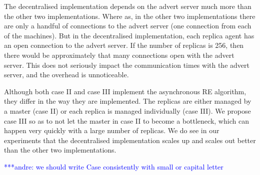 \documentclass{rspublic}
\newcommand{\jhanote}[1]{ {\textcolor{red} { ***shantenu: #1 }}}
\newcommand{\alnote}[1]{ {\textcolor{blue} { ***andre: #1 }}}
\newcommand{\alnote}[1]{}
\newcommand{\jhanote}[1]{}
\begin{document}
The decentralised implementation depends on the advert server much more than the other two implementations. Where as, in the other two implementations there are only a handful of connections to the advert server (one connection from each of the machines). But in the decentralised implementation, each replica agent has an open connection to the advert server. If the number of replicas is 256, then there would be approximately that many connections open with the advert server. This does not seriously impact the communication times with the advert server, and the overhead is unnoticeable.

Although both case II and case III implement the asynchronous RE algorithm, they differ in the way they are implemented. The replicas are either managed by a master (case II) or each replica is managed individually (case III). We propose case III so as to not let the master in case II to become a bottleneck, which can happen very quickly with a large number of replicas. We do see in our experiments that the decentralised implementation scales up and scales out better than the other two implementations.


\alnote{we should write Case consistently with small or capital letter}
\end{document}

